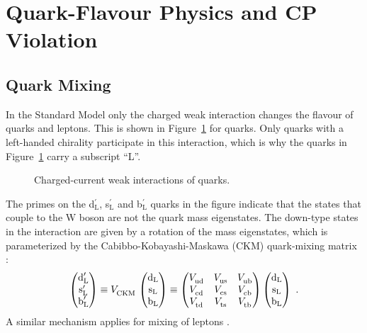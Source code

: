 \section{Quark-Flavour Physics and CP Violation}
\label{sec:intro_CPV}

\subsection{Quark Mixing}
\label{subsec:intro_mixCPV_mix}

In the Standard Model only the charged weak interaction changes the flavour of quarks and leptons. This is shown in
Figure~\ref{fig:WCouplings} for quarks. Only quarks with a left-handed chirality participate in this interaction, which is why the quarks
in Figure~\ref{fig:WCouplings} carry a subscript ``L''.
\begin{figure}[hbt]
  
  \caption{Charged-current weak interactions of quarks.}
  \label{fig:WCouplings}
\end{figure}

The primes on the d$_\text{L}^\prime$, s$_\text{L}^\prime$ and b$_\text{L}^\prime$ quarks in the figure indicate that the states that
couple to the W boson are not the quark mass eigenstates. The down-type states in the interaction are given by a rotation of the mass
eigenstates, which is parameterized by the Cabibbo-Kobayashi-Maskawa (CKM) quark-mixing matrix \cite{Kobayashi:1973fv}:
\begin{equation}
  \begin{pmatrix} \text{d}_\text{L}^\prime \\ \text{s}_\text{L}^\prime \\ \text{b}_\text{L}^\prime \end{pmatrix}
    \equiv \VCKM\, \begin{pmatrix} \text{d}_\text{L} \\ \text{s}_\text{L} \\ \text{b}_\text{L} \end{pmatrix}
    \equiv \begin{pmatrix} \Vud & \Vus & \Vub \\ \Vcd & \Vcs & \Vcb \\ \Vtd & \Vts & \Vtb \end{pmatrix}
           \begin{pmatrix} \text{d}_\text{L} \\ \text{s}_\text{L} \\ \text{b}_\text{L} \end{pmatrix}
    \ .
\end{equation}
A similar mechanism applies for mixing of leptons \cite{Pontecorvo:1957cp,*Pontecorvo:1957qd,*Maki:1962mu,*Pontecorvo:1967fh}.

